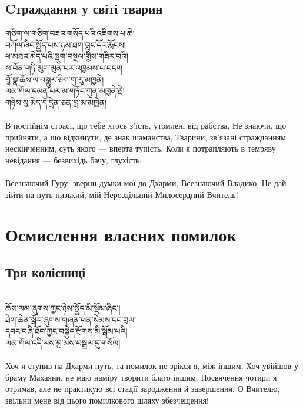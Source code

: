 \subsection*{Cтраждання у світі тварин}
\ti
གཅིག་ལ་གཅིག་བཟའ་གསོད་པའི་འཇིགས་པ་ཆེ།\\
བཀོལ་ཞིང་སྤྱོད་པས་ཉམ་ཐག་བླང་དོར་རྨོངས། \\
ཕ་མཐའ་མེད་པའི་སྡུག་བསྔལ་གྱིས་གཟིར་བའི། \\
ས་བོན་གཏི་མུག་མུན་པར་འཁྱམས་པ་བདག \\
བློ་སྣ་ཆོས་ལ་བསྒྱུར་ཅིག་གུ་རུ་མཁྱནེ། \\
ལམ་གོལ་དམན་པར་མ་གཏོང་ཀུན་མཁྱནེ་རྗེ། \\
གཉིས་སུ་མེད་དོ་དྲིན་ཅན་བླ་མ་མཁྱེན།\\
\\
\ru
В постійнім страсі, що тебе хтось з'їсть, утомлені від рабства,
Не знаючи, що прийняти, а що відкинути, де знак шаманства,
Тварини, зв'язані стражданням нескінченним, суть якого --- вперта тупість.
Коли я потрапляють в темряву невідання --- безвихідь бачу, глухість.\\
\\
Всезнаючий Гуру, зверни думки мої до Дхарми, Всезнаючий Владико,
Не дай зійти на путь низький, мій Нероздільний Милосердний Вчитель!

\section*{Осмислення власних помилок}
\subsection*{Три колісниці}
\\
\ti
ཆོས་ལམ་ཞུགས་ཀྱང་ཉེས་སྤྱོད་མི་སྡོམ་ཞིང་།\\
ཐེག་ཆེན་སྒོར་ཞུགས་གཞན་ཕན་སེམས་དང་བྲལ།\\
དབང་བཞི་ཐོབ་ཀྱང་བསྐྱེད་རྫོགས་མི་སྒོམ་པའི།\\
ལམ་གོལ་འདི་ལས་བླ་མས་བསྒྲལ་དུ་གསོལ།\\
\\
\ru
Хоч я ступив на Дхарми путь, та помилок не зрікся я, між іншим.
Хоч увійшов у браму Махаяни, не маю наміру творити благо іншим.
Посвячення чотири я отримав, але не практикую всі стадії зародження й завершення.
О Вчителю, звільни мене від цього помилкового шляху збезчещення!\\

